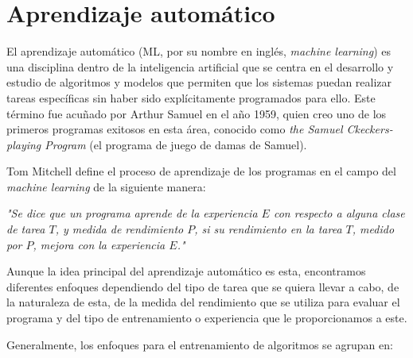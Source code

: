 \documentclass[11pt,spanish,listoffigures,listoftables]{tfgetsinf}
\begin{document}
\section{Aprendizaje automático}

El aprendizaje automático (ML, por su nombre en inglés, \textit{machine learning}) es una disciplina dentro de la inteligencia artificial que se centra en el desarrollo y estudio de algoritmos y modelos que permiten que los sistemas puedan realizar tareas específicas sin haber sido explícitamente programados para ello. Este término fue acuñado por Arthur Samuel en el año 1959, quien creo uno de los primeros programas exitosos en esta área, conocido como \textit{the Samuel Ckeckers-playing Program} \cite{samuelCheckers} (el programa de juego de damas de Samuel).

Tom Mitchell \cite{mitchell1997mcgraw} define el proceso de aprendizaje de los programas en el campo del \textit{machine learning} de la siguiente manera:

\begin{displayquote}
\textit{"Se dice que un programa aprende de la experiencia $E$ con respecto a alguna clase de tarea $T$, y medida de rendimiento $P$, si su rendimiento en la tarea $T$, medido por $P$, mejora con la experiencia $E$."}
\end{displayquote}

Aunque la idea principal del aprendizaje automático es esta, encontramos diferentes enfoques dependiendo del tipo de tarea que se quiera llevar a cabo, de la naturaleza de esta, de la medida del rendimiento que se utiliza para evaluar el programa y del tipo de entrenamiento o experiencia que le proporcionamos a este.

Generalmente, los enfoques para el entrenamiento de algoritmos se agrupan en:
\end{document}
